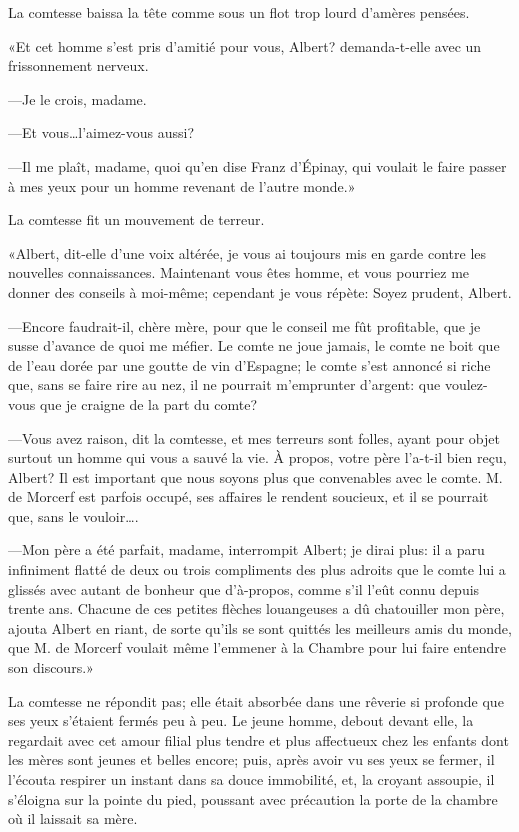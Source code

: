 La comtesse baissa la tête comme sous un flot trop lourd d'amères pensées. 

«Et cet homme s'est pris d'amitié pour vous, Albert? demanda-t-elle avec un frissonnement nerveux. 

—Je le crois, madame. 

—Et vous\dots l'aimez-vous aussi? 

—Il me plaît, madame, quoi qu'en dise Franz d'Épinay, qui voulait le faire passer à mes yeux pour un homme revenant de l'autre monde.» 

La comtesse fit un mouvement de terreur. 

«Albert, dit-elle d'une voix altérée, je vous ai toujours mis en garde contre les nouvelles connaissances. Maintenant vous êtes homme, et vous pourriez me donner des conseils à moi-même; cependant je vous répète: Soyez prudent, Albert. 

—Encore faudrait-il, chère mère, pour que le conseil me fût profitable, que je susse d'avance de quoi me méfier. Le comte ne joue jamais, le comte ne boit que de l'eau dorée par une goutte de vin d'Espagne; le comte s'est annoncé si riche que, sans se faire rire au nez, il ne pourrait m'emprunter d'argent: que voulez-vous que je craigne de la part du comte?  

—Vous avez raison, dit la comtesse, et mes terreurs sont folles, ayant pour objet surtout un homme qui vous a sauvé la vie. À propos, votre père l'a-t-il bien reçu, Albert? Il est important que nous soyons plus que convenables avec le comte. M. de Morcerf est parfois occupé, ses affaires le rendent soucieux, et il se pourrait que, sans le vouloir\dots. 

—Mon père a été parfait, madame, interrompit Albert; je dirai plus: il a paru infiniment flatté de deux ou trois compliments des plus adroits que le comte lui a glissés avec autant de bonheur que d'à-propos, comme s'il l'eût connu depuis trente ans. Chacune de ces petites flèches louangeuses a dû chatouiller mon père, ajouta Albert en riant, de sorte qu'ils se sont quittés les meilleurs amis du monde, que M. de Morcerf voulait même l'emmener à la Chambre pour lui faire entendre son discours.» 

La comtesse ne répondit pas; elle était absorbée dans une rêverie si profonde que ses yeux s'étaient fermés peu à peu. Le jeune homme, debout devant elle, la regardait avec cet amour filial plus tendre et plus affectueux chez les enfants dont les mères sont jeunes et belles encore; puis, après avoir vu ses yeux se fermer, il l'écouta respirer un instant dans sa douce immobilité, et, la croyant assoupie, il s'éloigna sur la pointe du pied, poussant avec précaution la porte de la chambre où il laissait sa mère. 

